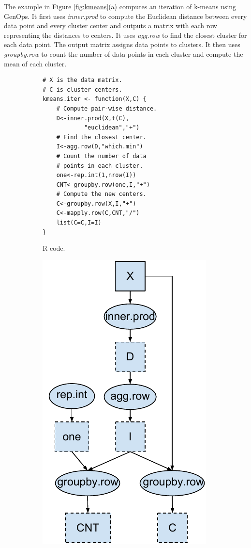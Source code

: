 The example in Figure \ref{fig:kmeans}(a) computes an iteration of k-means
\cite{kmeans} using GenOps. It first uses \textit{inner.prod} to
compute the Euclidean distance between every data point and every cluster center
and outputs a matrix with each row representing the distances to centers.  
It uses \textit{agg.row} to find the closest
cluster for each data point.  The output matrix 
assigns data points to clusters. It then uses \textit{groupby.row} to count
the number of data points in each cluster and compute the mean of each cluster.

\begin{figure}
\centering
	\footnotesize
	\begin{subfigure}{.25\textwidth}
	\centering
	\begin{verbatim}
# X is the data matrix.
# C is cluster centers.
kmeans.iter <- function(X,C) {
	# Compute pair-wise distance.
	D<-inner.prod(X,t(C),
			"euclidean","+")
	# Find the closest center.
	I<-agg.row(D,"which.min")
	# Count the number of data
	# points in each cluster.
	one<-rep.int(1,nrow(I))
	CNT<-groupby.row(one,I,"+")
	# Compute the new centers.
	C<-groupby.row(X,I,"+")
	C<-mapply.row(C,CNT,"/")
	list(C=C,I=I)
}
	\end{verbatim}
  \vspace{-4pt}
	\label{fig:code}
		\caption{R code.}
	\hspace{20pt}
	\end{subfigure}%
	\begin{subfigure}{.25\textwidth}
	\centering
  \vspace{-8pt}
	\includegraphics[scale=0.5]{FlashMatrix_figs/DAG.pdf}

\end{subfigure}
\end{figure}
